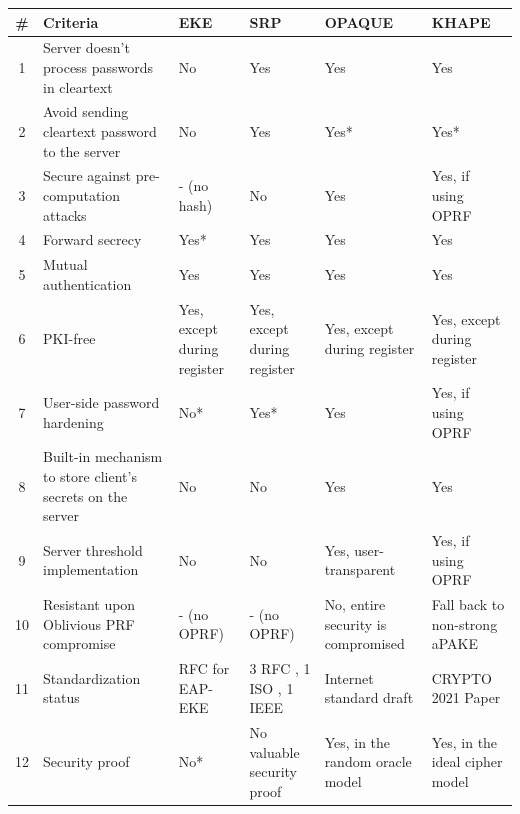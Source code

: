 \documentclass[../report.tex]{subfiles}
\begin{document}
\begin{center}
   \begin{tabular}{ | c | p{5cm} || p{2cm} | p{2cm} | p{2cm} | p{2cm} | }
     \hline
     \textbf{\#} & \textbf{Criteria} & \textbf{EKE} & \textbf{SRP} & \textbf{OPAQUE} & \textbf{KHAPE} \\ \hline
     
     
     
     1 & Server doesn't process passwords in cleartext & No & Yes & Yes & Yes \\ \hline
     2 & Avoid sending cleartext password to the server & No & Yes & Yes* & Yes* \\ \hline
     
     3 & Secure against pre-computation attacks & - (no hash) & No & Yes & Yes, if using OPRF \\ \hline
     4 & Forward secrecy & Yes* & Yes & Yes & Yes \\ \hline
     5 & Mutual authentication & Yes & Yes & Yes & Yes \\ \hline
     6 & PKI-free & Yes, except during register & Yes, except during register & Yes, except during register & Yes, except during register \\ \hline
     7 & User-side password hardening & No* & Yes* & Yes & Yes, if using OPRF \\ \hline
     8 & Built-in mechanism to store client's secrets on the server & No & No & Yes & Yes \\ \hline
     9 & Server threshold implementation & No & No & Yes, user-transparent & Yes, if using OPRF \\ \hline
     10 & Resistant upon Oblivious PRF compromise & - (no OPRF) & - (no OPRF) & No, entire security is compromised & Fall back to non-strong aPAKE \\ \hline
     11 & Standardization status & RFC for EAP-EKE \cite{EAP_EKE_RFC} & 3 RFC \cite{SRP_RFC_1, SRP_RFC_2, SRP_RFC_3}, 1 ISO \cite{SRP_ISO}, 1 IEEE \cite{SRP_IEEE} & Internet standard draft \cite{OPAQUE_Standard_Draft} & CRYPTO 2021 Paper \cite{KHAPE_Paper} \\ \hline
     12 & Security proof & No* & No valuable security proof \cite{CAA} & Yes, in the random oracle model & Yes, in the ideal cipher model \\ \hline
     
     \end{tabular}
 \end{center}
 
\end{document}
